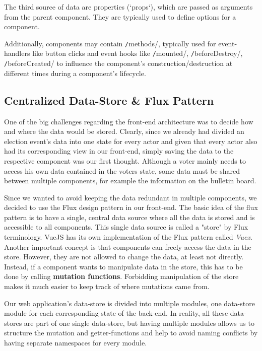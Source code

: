 The third source of data are properties (`props`), which are passed as arguments from the parent component. They are typically used to define options for a component.

Additionally, components may contain \texttt/methods/, typically used for event-handlers like button clicks and event hooks like \texttt/mounted/, \texttt/beforeDestroy/, \texttt/beforeCreated/ to influence the component's construction/destruction at different times during a component's lifecycle.

\subsection{Centralized Data-Store \& Flux Pattern}
One of the big challenges regarding the front-end architecture was to decide how and where the data would be stored. Clearly, since we already had divided an election event's data into one state for every actor and given that every actor also had its corresponding view in our front-end, simply saving the data to the respective component was our first thought. Although a voter mainly needs to access his own data contained in the voters state, some data must be shared between multiple components, for example the information on the bulletin board.

Since we wanted to avoid keeping the data redundant in multiple components, we decided to use the Flux design pattern in our front-end. The basic idea of the flux pattern is to have a single, central data source where all the data is stored and is accessible to all components. This single data source is called a "{}store"{} by Flux terminology. VueJS has its own implementation of the Flux pattern called \textit{Vuex}. Another important concept is that components can freely access the data in the store. However, they are not allowed to change the data, at least not directly. Instead, if a component wants to manipulate data in the store, this has to be done by calling \textbf{mutation functions}. Forbidding manipulation of the store makes it much easier to keep track of where mutations came from.

Our web application's data-store is divided into multiple modules, one data-store module for each corresponding state of the back-end. In reality, all these data-stores are part of one single data-store, but having multiple modules allows us to structure the mutation and getter-functions and help to avoid naming conflicts by having separate namespaces for every module.

